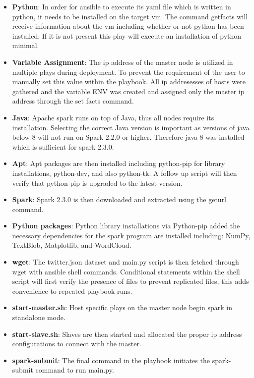 \begin{itemize}

\item \textbf{Python}: In order for ansible to execute its yaml file
 which is written in python, it needs to be installed on the
 target vm.  The command getfacts will receive information about the
 vm including whether or not python has been installed.  If it is not
 present this play will execute an installation of python minimal.

\item \textbf{Variable Assignment}: The ip address of the master node
 is utilized in multiple plays during deployment. To prevent the
 requirement of the user to manually set this value within the
 playbook. All ip addresesses of hosts were gathered and the variable
 ENV was created and assigned only the master ip address through the
 set facts command.
 
\item \textbf{Java}: Apache spark runs on top of Java, thus all nodes
 require its installation.  Selecting the correct Java version is
 important as versions of java below 8 will not run on Spark 2.2.0 or
 higher.  Therefore java 8 was installed which is sufficient for spark
 2.3.0.

\item \textbf{Apt}: Apt packages are then installed including
python-pip for library installations, python-dev, and also python-tk.
A follow up script will then verify that python-pip is upgraded to the
latest version.

\item \textbf{Spark}: Spark 2.3.0 is then downloaded and extracted
using the geturl command.

\item \textbf{Python packages}: Python library installations via
Python-pip added the necessary dependencies for the spark program are
installed including: NumPy, TextBlob, Matplotlib, and WordCloud.

\item \textbf{wget}: The twitter.json dataset and
main.py script is then fetched through wget with ansible shell
commands.  Conditional statements within the shell script will first
verify the presence of files to prevent replicated files, this adds
convenience to repeated playbook runs.

\item \textbf{start-master.sh}: Host specific plays on the master
node begin spark in standalone mode.

\item \textbf{start-slave.sh}: Slaves are then started and allocated the
 proper ip address configurations to connect with the master.

\item \textbf{spark-submit}: The final command in the playbook
 initiates the spark-submit command to run main.py.

\end{itemize}



